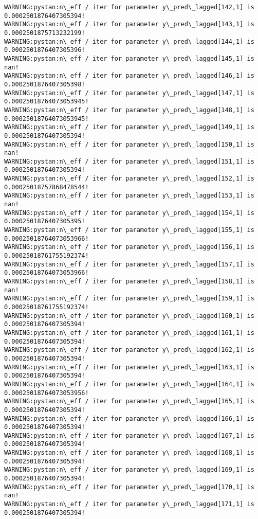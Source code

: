 \documentclass[11pt]{article}
\begin{document}
\begin{Verbatim}[commandchars=\\\{\}]
WARNING:pystan:n\_eff / iter for parameter y\_pred\_lagged[142,1] is 0.0002501876407305394!
WARNING:pystan:n\_eff / iter for parameter y\_pred\_lagged[143,1] is 0.0002501875713232199!
WARNING:pystan:n\_eff / iter for parameter y\_pred\_lagged[144,1] is 0.0002501876407305396!
WARNING:pystan:n\_eff / iter for parameter y\_pred\_lagged[145,1] is nan!
WARNING:pystan:n\_eff / iter for parameter y\_pred\_lagged[146,1] is 0.0002501876407305398!
WARNING:pystan:n\_eff / iter for parameter y\_pred\_lagged[147,1] is 0.00025018764073053945!
WARNING:pystan:n\_eff / iter for parameter y\_pred\_lagged[148,1] is 0.00025018764073053945!
WARNING:pystan:n\_eff / iter for parameter y\_pred\_lagged[149,1] is 0.0002501876407305394!
WARNING:pystan:n\_eff / iter for parameter y\_pred\_lagged[150,1] is nan!
WARNING:pystan:n\_eff / iter for parameter y\_pred\_lagged[151,1] is 0.0002501876407305394!
WARNING:pystan:n\_eff / iter for parameter y\_pred\_lagged[152,1] is 0.00025018757868478544!
WARNING:pystan:n\_eff / iter for parameter y\_pred\_lagged[153,1] is nan!
WARNING:pystan:n\_eff / iter for parameter y\_pred\_lagged[154,1] is 0.0002501876407305395!
WARNING:pystan:n\_eff / iter for parameter y\_pred\_lagged[155,1] is 0.00025018764073053966!
WARNING:pystan:n\_eff / iter for parameter y\_pred\_lagged[156,1] is 0.00025018761755192374!
WARNING:pystan:n\_eff / iter for parameter y\_pred\_lagged[157,1] is 0.00025018764073053966!
WARNING:pystan:n\_eff / iter for parameter y\_pred\_lagged[158,1] is nan!
WARNING:pystan:n\_eff / iter for parameter y\_pred\_lagged[159,1] is 0.00025018761755192374!
WARNING:pystan:n\_eff / iter for parameter y\_pred\_lagged[160,1] is 0.0002501876407305394!
WARNING:pystan:n\_eff / iter for parameter y\_pred\_lagged[161,1] is 0.0002501876407305394!
WARNING:pystan:n\_eff / iter for parameter y\_pred\_lagged[162,1] is 0.0002501876407305394!
WARNING:pystan:n\_eff / iter for parameter y\_pred\_lagged[163,1] is 0.0002501876407305394!
WARNING:pystan:n\_eff / iter for parameter y\_pred\_lagged[164,1] is 0.00025018764073053956!
WARNING:pystan:n\_eff / iter for parameter y\_pred\_lagged[165,1] is 0.0002501876407305394!
WARNING:pystan:n\_eff / iter for parameter y\_pred\_lagged[166,1] is 0.0002501876407305394!
WARNING:pystan:n\_eff / iter for parameter y\_pred\_lagged[167,1] is 0.0002501876407305394!
WARNING:pystan:n\_eff / iter for parameter y\_pred\_lagged[168,1] is 0.0002501876407305394!
WARNING:pystan:n\_eff / iter for parameter y\_pred\_lagged[169,1] is 0.0002501876407305394!
WARNING:pystan:n\_eff / iter for parameter y\_pred\_lagged[170,1] is nan!
WARNING:pystan:n\_eff / iter for parameter y\_pred\_lagged[171,1] is 0.0002501876407305394!

\end{Verbatim}
\end{document}
